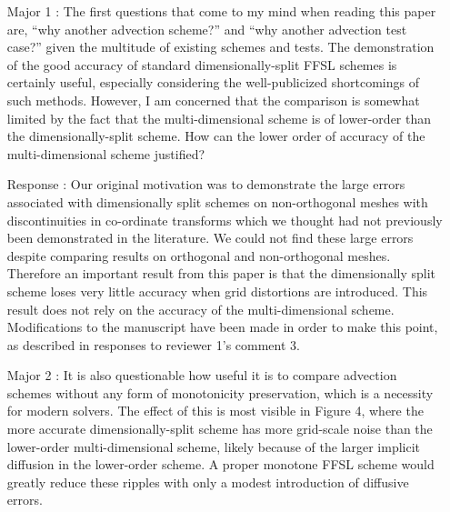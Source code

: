 \documentclass[12pt]{article}
\begin{document}
\begin{enumerate}
\item [Major 1]: The first questions that come to my mind when reading this paper are, ``why another advection scheme?'' and ``why another advection test case?'' given the multitude of existing schemes and tests. The demonstration of the good accuracy of standard dimensionally-split FFSL schemes is certainly useful, especially considering the well-publicized shortcomings of such methods. However, I am concerned that the comparison is somewhat limited by the fact that the multi-dimensional scheme is of lower-order than the dimensionally-split scheme. How can the lower order of accuracy of the multi-dimensional scheme justified?

\item [Response]: 
Our original motivation was to demonstrate the large errors associated with dimensionally split schemes on non-orthogonal meshes with discontinuities in co-ordinate transforms which we thought had not previously been demonstrated in the literature. We could not find these large errors despite comparing results on orthogonal and non-orthogonal meshes. Therefore an important result from this paper is that the dimensionally split scheme loses very little
accuracy when grid distortions are introduced. This result does not rely on the accuracy of the multi-dimensional scheme. Modifications to the manuscript have been made in order to make this point, as described in responses to reviewer 1's comment 3. 

\item [Major  2]: It is also questionable how useful it is to compare advection schemes without any form of monotonicity preservation, which is a necessity for modern solvers. The effect of this is most visible in Figure 4, where the more accurate dimensionally-split scheme has more grid-scale noise than the lower-order multi-dimensional scheme, likely because of the larger implicit diffusion in the lower-order scheme. A proper monotone FFSL scheme would greatly reduce these ripples with only a modest introduction of diffusive errors.


\end{enumerate}
\end{document}
